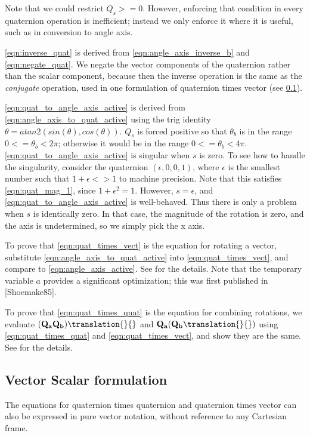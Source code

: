 \documentclass{book}
\numberwithin{equation}{subsection}
\begin{document}
Note that we could restrict $Q_s >= 0$. However, enforcing that
condition in every quaternion operation is inefficient; instead we
only enforce it where it is useful, such as in conversion to angle axis.

\ref{eqn:inverse_quat} is derived from
\ref{eqn:angle_axis_inverse_b} and \ref{eqn:negate_quat}. We negate
the vector components of the quaternion rather than the scalar
component, because then the inverse operation is the same as the
\emph{conjugate} operation, used in one formulation of quaternion
times vector (see \ref{sec:vector_scalar_quaternion}).

\ref{eqn:quat_to_angle_axis_active} is derived from
\ref{eqn:angle_axis_to_quat_active} using the trig identity $\theta = atan2
(sin(\theta), cos(\theta))$. $Q_s$ is forced positive so that $\theta_b$
is in the range $0 <= \theta_b < 2\pi$; otherwise it would be in the
range $0 <= \theta_b < 4\pi$. \ref{eqn:quat_to_angle_axis_active} is singular
when $s$ is zero. To see how to handle the singularity, consider the
quaternion $(\epsilon, 0, 0, 1)$, where $\epsilon$ is the smallest
number such that $1 + \epsilon <> 1$ to machine precision. Note
that this satisfies \ref{eqn:quat_mag_1}, since $1 + \epsilon^2 = 1$.
However, $s = \epsilon$, and \ref{eqn:quat_to_angle_axis_active} is
well-behaved. Thus there is only a problem when $s$ is identically
zero. In that case, the magnitude of the rotation is zero, and the
axis is undetermined, so we simply pick the x axis.

To prove that \ref{eqn:quat_times_vect} is the equation for
rotating a vector, substitute \ref{eqn:angle_axis_to_quat_active}
into \ref{eqn:quat_times_vect}, and compare to
\ref{eqn:angle_axis_active}. See 
for the details. Note that the temporary variable $a$ provides a
significant optimization; this was first published in [Shoemake85].

To prove that \ref{eqn:quat_times_quat} is the equation for combining
rotations, we evaluate $({\bf Q_a}{\bf Q_b})\translation{}{}$ and
${\bf Q_a}({\bf Q_b}\translation{}{})$ using \ref{eqn:quat_times_quat}
and \ref{eqn:quat_times_vect}, and show they are the same. See
 for the details.

\subsection{Vector Scalar formulation}
\label{sec:vector_scalar_quaternion}
The equations for quaternion times quaternion and quaternion times
vector can also be expressed in pure vector notation, without
reference to any Cartesian frame.
\end{document}
